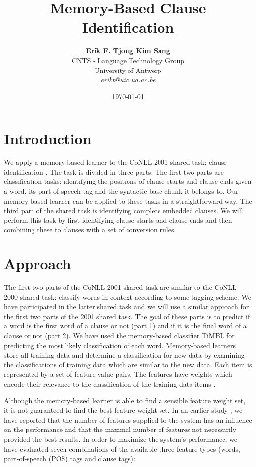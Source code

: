 \documentclass[11pt]{article}
\title{{\bf Memory-Based Clause Identification}}
\author{
\begin{tabular}{cc}
{\bf Erik F. Tjong Kim Sang}\\
CNTS - Language Technology Group\\
University of Antwerp\\
{\it erikt@uia.ua.ac.be}
\end{tabular}
}
\date{\today}
\begin{document}
\maketitle

\section{Introduction}

We apply a memory-based learner to the CoNLL-2001 shared task: clause
identification
\cite{tksdj2001}.
The task is divided in three parts.
The first two parts are classification tasks: identifying the
positions of clause starts and clause ends given a word, its
part-of-speech tag and the syntactic base chunk it belongs to.
Our memory-based learner can be applied to these tasks in a 
straightforward way.
The third part of the shared task is identifying complete embedded
clauses.
We will perform this task by first identifying clause starts and
clause ends and then combining these to clauses with a set of 
conversion rules.

\section{Approach}

The first two parts of the CoNLL-2001 shared task are similar to the
CoNLL-2000 shared task: classify words in context according to some
tagging scheme.
We have participated in the latter shared task \cite{tks2000d} and we
will use a similar approach for the first two parts of the 2001 shared
task. 
The goal of these parts is to predict if a word is the first word of a
clause or not (part 1) and if it is the final word of a clause or not
(part 2).
We have used the memory-based classifier TiMBL \cite{timbl2000} for
predicting the most likely classification of each word.
Memory-based learners store all training data and determine a
classification for new data by examining the classifications of
training data which are similar to the new data.
Each item is represented by a set of feature-value pairs.
The features have weights which encode their relevance to the
classification of the training data items \cite{timbl2000}.

Although the memory-based learner is able to find a sensible feature
weight set, it is not guaranteed to find the best feature weight set.
In an earlier study \cite{tks99}, we have reported that the number of
features supplied to the system has an influence on the performance
and that the maximal number of features not necessarily provided the
best results.
In order to maximize the system's performance, we have evaluated seven
combinations of the available three feature types (words,
part-of-speech (POS) tags and clause tags):
\end{document}
